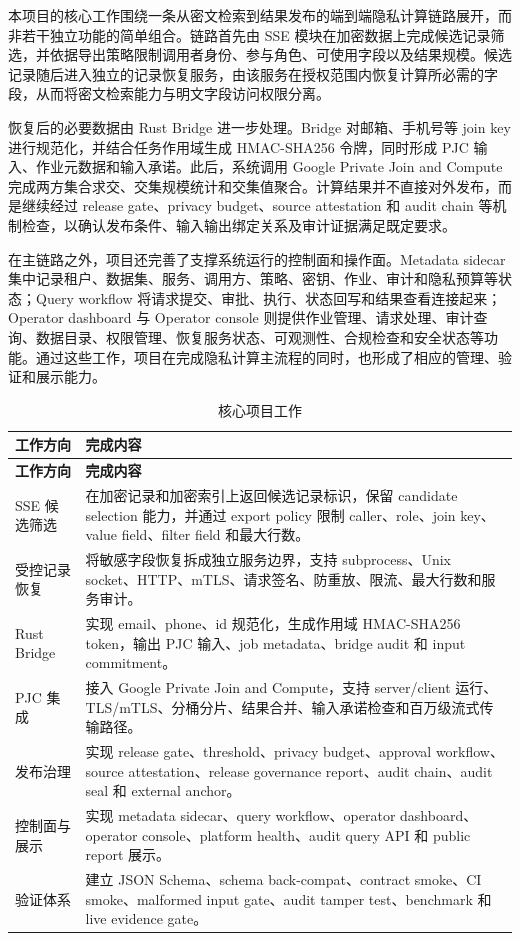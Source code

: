 \documentclass[UTF8,a4paper,12pt,oneside]{ctexrep}
\begin{document}
本项目的核心工作围绕一条从密文检索到结果发布的端到端隐私计算链路展开，而非若干独立功能的简单组合。链路首先由 SSE 模块在加密数据上完成候选记录筛选，并依据导出策略限制调用者身份、参与角色、可使用字段以及结果规模。候选记录随后进入独立的记录恢复服务，由该服务在授权范围内恢复计算所必需的字段，从而将密文检索能力与明文字段访问权限分离。

恢复后的必要数据由 Rust Bridge 进一步处理。Bridge 对邮箱、手机号等 join key 进行规范化，并结合任务作用域生成 HMAC-SHA256 令牌，同时形成 PJC 输入、作业元数据和输入承诺。此后，系统调用 Google Private Join and Compute 完成两方集合求交、交集规模统计和交集值聚合。计算结果并不直接对外发布，而是继续经过 release gate、privacy budget、source attestation 和 audit chain 等机制检查，以确认发布条件、输入输出绑定关系及审计证据满足既定要求。

在主链路之外，项目还完善了支撑系统运行的控制面和操作面。Metadata sidecar 集中记录租户、数据集、服务、调用方、策略、密钥、作业、审计和隐私预算等状态；Query workflow 将请求提交、审批、执行、状态回写和结果查看连接起来；Operator dashboard 与 Operator console 则提供作业管理、请求处理、审计查询、数据目录、权限管理、恢复服务状态、可观测性、合规检查和安全状态等功能。通过这些工作，项目在完成隐私计算主流程的同时，也形成了相应的管理、验证和展示能力。

\begin{longtable}{p{}p{}}
\caption{核心项目工作}\\
\toprule
\textbf{工作方向} & \textbf{完成内容} \\
\midrule
\endfirsthead
\toprule
\textbf{工作方向} & \textbf{完成内容} \\
\midrule
\endhead
\bottomrule
\endfoot
SSE 候选筛选 & 在加密记录和加密索引上返回候选记录标识，保留 candidate selection 能力，并通过 export policy 限制 caller、role、join key、value field、filter field 和最大行数。 \\
受控记录恢复 & 将敏感字段恢复拆成独立服务边界，支持 subprocess、Unix socket、HTTP、mTLS、请求签名、防重放、限流、最大行数和服务审计。 \\
Rust Bridge & 实现 email、phone、id 规范化，生成作用域 HMAC-SHA256 token，输出 PJC 输入、job metadata、bridge audit 和 input commitment。 \\
PJC 集成 & 接入 Google Private Join and Compute，支持 server/client 运行、TLS/mTLS、分桶分片、结果合并、输入承诺检查和百万级流式传输路径。 \\
发布治理 & 实现 release gate、threshold、privacy budget、approval workflow、source attestation、release governance report、audit chain、audit seal 和 external anchor。 \\
控制面与展示 & 实现 metadata sidecar、query workflow、operator dashboard、operator console、platform health、audit query API 和 public report 展示。 \\
验证体系 & 建立 JSON Schema、schema back-compat、contract smoke、CI smoke、malformed input gate、audit tamper test、benchmark 和 live evidence gate。 \\
\end{longtable}
\end{document}
